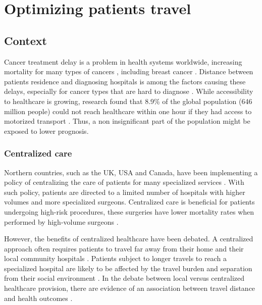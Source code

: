 \chapter{Optimizing patients travel}

\section{Context}

Cancer treatment delay is a problem in health systems worldwide, increasing
mortality for many types of cancers \cite{hanna_mortality_2020}, including
breast cancer \cite{caplan_delay_1992, williams_assessment_2015,
    pace_delays_2015}. Distance between patients residence and diagnosing hospitals
is among the factors causing these delays, especially for cancer types that are
hard to diagnose \cite{flytkjaer_virgilsen_cancer_2019}. While accessibility to
healthcare is growing, research found that 8.9\% of the global population (646
million people) could not reach healthcare within one hour if they had access to
motorized transport \cite{weiss_global_2020}. Thus, a non insignificant part of
the population might be exposed to lower prognosis.

\subsection{Centralized care}

Northern countries, such as the UK, USA and Canada, have been implementing a
policy of centralizing the care of patients for many specialized services
\cite{kelly_are_2016}. With such policy, patients are directed to a limited
number of hospitals with higher volumes and more specialized surgeons.
Centralized care is beneficial for patients undergoing high-risk procedures,
these surgeries have lower mortality rates when performed by high-volume
surgeons
\cite{pekala_centralization_2021,birkmeyer_surgeon_2003,finks_trends_2011,hollenbeck_getting_2007,goossens-laan_systematic_2011}.

However, the benefits of centralized healthcare have been debated. A centralized
approach often requires patients to travel far away from their home and their
local community hospitals \cite{woo_centralisation_2012}. Patients subject to
longer travels to reach a specialized hospital are likely to be affected by the
travel burden and separation from their social environment
\cite{payne_impact_2000}. In the debate between local versus centralized
healthcare provision, there are evidence of an association between travel
distance and health outcomes \cite{kelly_are_2016}.

